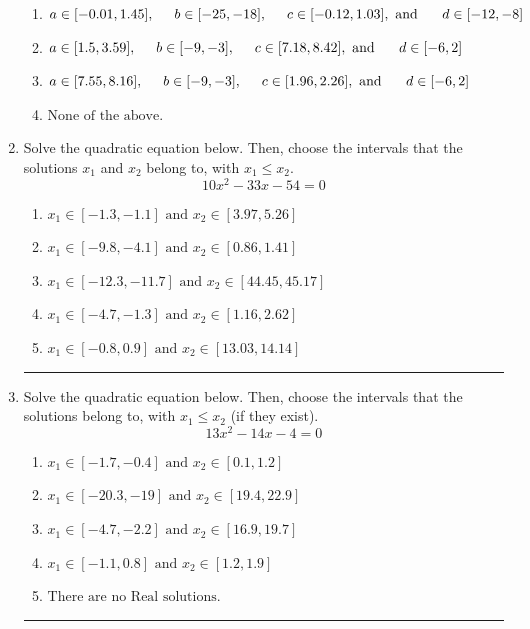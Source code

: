 \documentclass[14pt]{extbook}
\newcommand{\litem}[1]{\item#1\hspace*{-1cm}\rule{\textwidth}{0.4pt}}
\begin{document}
\begin{enumerate}
{\begin{enumerate}[label=\Alph*.]
\item \( a \in [-0.01, 1.45], \hspace*{5mm} b \in [-25, -18], \hspace*{5mm} c \in [-0.12, 1.03], \text{ and } \hspace*{5mm} d \in [-12, -8] \)
\item \( a \in [1.5, 3.59], \hspace*{5mm} b \in [-9, -3], \hspace*{5mm} c \in [7.18, 8.42], \text{ and } \hspace*{5mm} d \in [-6, 2] \)
\item \( a \in [7.55, 8.16], \hspace*{5mm} b \in [-9, -3], \hspace*{5mm} c \in [1.96, 2.26], \text{ and } \hspace*{5mm} d \in [-6, 2] \)
\item \( \text{None of the above.} \)

\end{enumerate} }
\litem{
Solve the quadratic equation below. Then, choose the intervals that the solutions $x_1$ and $x_2$ belong to, with $x_1 \leq x_2$.\[ 10x^{2} -33 x -54 = 0 \]\begin{enumerate}[label=\Alph*.]
\item \( x_1 \in [-1.3, -1.1] \text{ and } x_2 \in [3.97, 5.26] \)
\item \( x_1 \in [-9.8, -4.1] \text{ and } x_2 \in [0.86, 1.41] \)
\item \( x_1 \in [-12.3, -11.7] \text{ and } x_2 \in [44.45, 45.17] \)
\item \( x_1 \in [-4.7, -1.3] \text{ and } x_2 \in [1.16, 2.62] \)
\item \( x_1 \in [-0.8, 0.9] \text{ and } x_2 \in [13.03, 14.14] \)

\end{enumerate} }
\litem{
Solve the quadratic equation below. Then, choose the intervals that the solutions belong to, with $x_1 \leq x_2$ (if they exist).\[ 13x^{2} -14 x -4 = 0 \]\begin{enumerate}[label=\Alph*.]
\item \( x_1 \in [-1.7, -0.4] \text{ and } x_2 \in [0.1, 1.2] \)
\item \( x_1 \in [-20.3, -19] \text{ and } x_2 \in [19.4, 22.9] \)
\item \( x_1 \in [-4.7, -2.2] \text{ and } x_2 \in [16.9, 19.7] \)
\item \( x_1 \in [-1.1, 0.8] \text{ and } x_2 \in [1.2, 1.9] \)
\item \( \text{There are no Real solutions.} \)


\end{enumerate}}
\end{enumerate}
\end{document}
